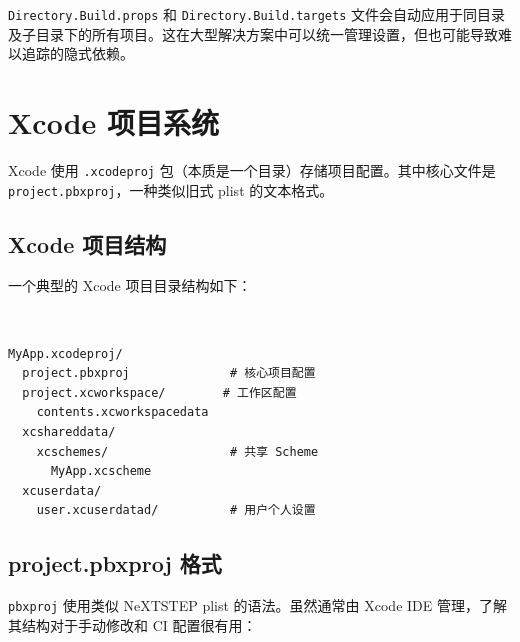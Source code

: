 \documentclass[12pt,a4paper,fontset=fandol]{ctexbook}
\newcommand{\Tp}[1]{\texttt{#1}}
\newcommand{\bashlabel}{%
  \noindent\begin{tcolorbox}[sharp corners,colback=cfgheadbg,colframe=cfgheadbg,
    left=6pt,right=6pt,top=2pt,bottom=2pt,boxrule=0pt]
  \textcolor{white}{\small\bfseries\sffamily Shell}\end{tcolorbox}%
}
\begin{document}
\begin{warning}
\Tp{Directory.Build.props} 和 \Tp{Directory.Build.targets} 文件会自动应用于同目录及子目录下的所有项目。这在大型解决方案中可以统一管理设置，但也可能导致难以追踪的隐式依赖。
\end{warning}

\chapter{Xcode 项目系统}

{\sloppy Xcode 使用 \Tp{.xcodeproj} 包（本质是一个目录）存储项目配置。其中核心文件是 \Tp{project.pbxproj}，一种类似旧式 plist 的文本格式。\par}

\section{Xcode 项目结构}

一个典型的 Xcode 项目目录结构如下：

\bashlabel
\begin{lstlisting}[style=bashstyle]
MyApp.xcodeproj/
  project.pbxproj              # 核心项目配置
  project.xcworkspace/        # 工作区配置
    contents.xcworkspacedata
  xcshareddata/
    xcschemes/                 # 共享 Scheme
      MyApp.xcscheme
  xcuserdata/
    user.xcuserdatad/          # 用户个人设置
\end{lstlisting}

\section{project.pbxproj 格式}

\Tp{pbxproj} 使用类似 NeXTSTEP plist 的语法。虽然通常由 Xcode IDE 管理，了解其结构对于手动修改和 CI 配置很有用：
\end{document}
